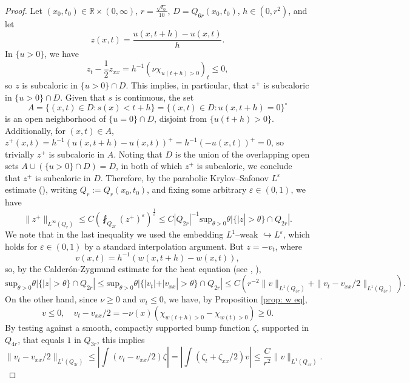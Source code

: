\documentclass{article}
\numberwithin{equation}{section}
\numberwithin{figure}{section}
\theoremstyle{plain}
\theoremstyle{plain}
\theoremstyle{plain}
\theoremstyle{plain}
\theoremstyle{definition}
\theoremstyle{remark}
\def\vep{\varepsilon}
\def\R{{\mathbb{R}}}
\begin{document}
\begin{proof} Let $(x_0,t_0) \in \R \times (0,\infty)$,  $r=\frac{\sqrt{t_0}}{10}$, $D=Q_{6r}(x_0,t_0)$, $h\in (0,r^2)$, and let
\[z(x,t)=\frac{u(x,t+h)-u(x,t)}{h}.\]
In $\{u>0\}$, we have
\[z_t-\frac12 z_{xx}=  h^{-1}(\nu \chi_{u(t+h)>0})_t \leq0,\]
so $z$ is subcaloric in $\{u>0\}\cap D$. This implies, in particular, that $z^+$ is subcaloric in $\{u>0\}\cap D$. Given that $s$ is continuous, the set
\[ A=\{(x,t)\in D: s(x)<t+h\}=\{(x,t)\in D: u(x,t+h)=0\}^{\circ}\] is an open neighborhood of $\{u=0\}\cap D$, disjoint from $\{u(t+h)>0\}$. Additionally, for $(x,t)\in A$, $z^+(x,t)=h^{-1}(u(x,t+h)-u(x,t))^+=h^{-1}(-u(x,t))^+=0$, so trivially $z^+$ is subcaloric in $A$. Noting that $D$ is the union of the overlapping open sets $A \cup (\{u>0\}\cap D)=D$, in both of which $z^+$ is subcaloric, we conclude that $z^+$ is subcaloric in $D$. Therefore, by the parabolic Krylov--Safonov $L^{\vep}$ estimate (\cite[Thm. 4.16]{wang}), writing $Q_r := Q_r(x_0,t_0)$, and fixing some arbitrary $\vep \in (0,1)$, we have
\begin{equation} \label{cz2-edlsmg1}
\|z^+\|_{L^{\infty}(Q_r)}\leq C \left( \fint_{Q_{2r}} (z^+)^{\vep}  \right)^{\frac{1}{\vep}} \leq C|Q_{2r}|^{-1}\text{sup}_{\theta>0}\theta |\{|z|>\theta\}\cap Q_{2r}|.
\end{equation}
We note that in the last inequality we used the embedding $L^1$--weak $\hookrightarrow L^{\vep} $, which holds for $\vep \in (0,1)$ by a standard interpolation argument. But $z = -v_t$, where 
\[v(x,t)=h^{-1}(w(x,t+h)-w(x,t)),\]
so, by the Calder\'on-Zygmund estimate for the heat equation (see \cite[Thm. 3.5]{figalli}, \cite{jones}),
\begin{equation}\label{cz2-edlsmg2}\text{sup}_{\theta>0}\theta |\{|z|>\theta\}\cap Q_{2r}|\leq \text{sup}_{\theta>0}\theta |\{|v_t|+|v_{xx}|>\theta\}\cap Q_{2r}| \leq C(r^{-2}\|v\|_{L^1(Q_{3r})}+\|v_t-v_{xx}/2\|_{L^1(Q_{3r})}).\end{equation}
On the other hand, since $\nu \geq0$ and $w_t \leq 0$, we have, by Proposition \ref{prop: w eq},
\[v\leq 0, \quad v_t- v_{xx}/2=-\nu(x)(\chi_{w(t+h)>0}-\chi_{w(t)>0})\geq 0.\]
By testing against a smooth, compactly supported bump function $\zeta$, supported in $Q_{4r}$, that equals $1$ in $Q_{3r}$, this implies
\begin{equation}\label{cz2-edlsmg3}\|v_t-v_{xx}/2\|_{L^1(Q_{3r})}\leq \left|\int(v_t-v_{xx}/2)\zeta\right|=\left|\int(\zeta_t+\zeta_{xx}/2)v\right| \leq \frac{C}{r^2}\|v\|_{L^1(Q_{4r})}.\end{equation}

\end{proof}
\end{document}
